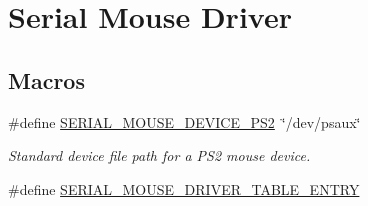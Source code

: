 \hypertarget{group__libmisc__serialmouse}{}\section{Serial Mouse Driver}
\label{group__libmisc__serialmouse}
\subsection*{Macros}
\begin{DoxyCompactItemize}
\item 
\mbox{\label{group__libmisc__serialmouse_gaa1a6cf0cf2006b633b07466459f07e0b}} 
\#define \mbox{\hyperlink{group__libmisc__serialmouse_gaa1a6cf0cf2006b633b07466459f07e0b}{S\+E\+R\+I\+A\+L\+\_\+\+M\+O\+U\+S\+E\+\_\+\+D\+E\+V\+I\+C\+E\+\_\+\+P\+S2}}~\char`\"{}/dev/psaux\char`\"{}
\begin{DoxyCompactList}\small\item\em Standard device file path for a P\+S2 mouse device. \end{DoxyCompactList}\item 
\#define \mbox{\hyperlink{group__libmisc__serialmouse_ga8b4f360283d45558bb392ba1c78fd2fe}{S\+E\+R\+I\+A\+L\+\_\+\+M\+O\+U\+S\+E\+\_\+\+D\+R\+I\+V\+E\+R\+\_\+\+T\+A\+B\+L\+E\+\_\+\+E\+N\+T\+RY}}
\end{DoxyCompactItemize}

